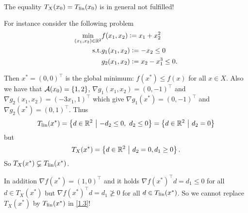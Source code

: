 \begin{example}\label{ex1.8}
    The equality \(T_X(x_0) = T_{\mathrm{lin}}(x_0)\) is in general not fulfilled!

    For instance consider the following problem
    \begin{align*}
        \min_{(x_1, x_2) \in \mathbb{R}^2} & f(x_1, x_2) \mathrel{\mathop:}= x_1 + x_2^2 \\
        \mathrm{s.t.} & g_1(x_1, x_2) \mathrel{\mathop:}= -x_2 \le 0 \\
        & g_2(x_1, x_2) \mathrel{\mathop:}= x_2 - x_1^3 \le 0.
    \end{align*}

    Then \(x^* = (0,0)^\top\) is the global minimum: \(f(x^*) \le f(x)\) for all \(x \in X\). Also we have that \(\mathcal{A}(x_0) = \{1,2\}\), \(\nabla g_1(x_1, x_2) = (0, -1)^\top\) and \(\nabla g_2 (x_1, x_2) = (-3 x_1, 1)^\top\) which give \(\nabla g_1(x^*) = (0, -1)^\top\) and \(\nabla g_2(x^*) = (0,1)^\top\). Thus \[\Tlin(x^*) = \left\{d \in \R^2 \ \middle| \ -d_2 \le 0 ,\ d_2 \le 0\right\} = \left\{d \in \R^2 \ \middle| \ d_2 = 0\right\}\] but \[T_X(x^*) = \left\{d \in \mathbb{R}^2 \ \middle| \ d_2 = 0, d_1 \ge 0\right\}.\] So \(T_X(x^*) \varsubsetneq T_{\mathrm{lin}}(x^*)\).

    In addition \(\nabla f(x^*) = (1,0)^\top\) and it holds \(\nabla f(x^*)^\top d = d_1 \le 0\) for all \(d \in T_X(x^*)\) but \(\nabla f(x^*)^\top d = d_1 \ngeq 0\) for all \(d \in T_{\mathrm{lin}}(x^*)\). So we cannot replace \(T_X(x^*)\) by \(T_{\mathrm{lin}}(x^*)\) in \eqref{1.3}!
\end{example}

